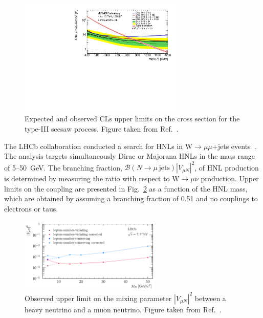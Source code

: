 \documentclass[a4paper,11pt]{article}
\begin{document}
\begin{figure}[htbp]
\begin{center}
\includegraphics[width=0.7\textwidth]{ATLAS-CONF-2021-023.pdf}
\caption{\label{fig:ATLAS-CONF-2021-023}Expected and observed CLs upper limits on the cross section for the type-III seesaw process. Figure taken from Ref.~\cite{ATLAS-CONF-2021-023}.}
\end{center}
\end{figure}

The LHCb collaboration conducted a search for HNLs in $\textrm{W}\to\mu\mu$+jets events~\cite{LHCb-PAPER-2020-022}. The analysis targets simultaneously Dirac or Majorana HNLs in the mass range of 5--50~GeV. The branching fraction, $\mathcal{B}(N\to\mu\,\textrm{jets})|V_{\mu N}|^2$, of HNL production is determined by measuring the ratio with respect to $\textrm{W}\to\mu\nu$ production. Upper limits on the coupling are presented in Fig.~\ref{fig:LHCb-PAPER-2020-022} as a function of the HNL mass, which are obtained by assuming a branching fraction of 0.51 and no couplings to electrons or taus.

\begin{figure}[htbp]
\begin{center}
\includegraphics[width=0.6\textwidth]{LHCb-PAPER-2020-022.pdf}
\caption{\label{fig:LHCb-PAPER-2020-022}Observed upper limit on the mixing parameter $|V_{\mu N}|^2$ between a heavy neutrino and a muon neutrino. Figure taken from Ref.~\cite{LHCb-PAPER-2020-022}.}
\end{center}
\end{figure}
\end{document}
